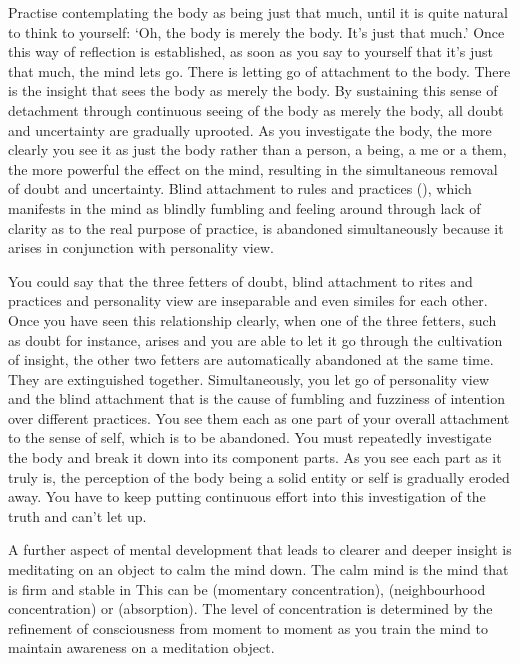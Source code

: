 Practise contemplating the body as being just that much, until it is quite natural to think to yourself: `Oh, the body is merely the body. It's just that much.' Once this way of reflection is established, as soon as you say to yourself that it's just that much, the mind lets go. There is letting go of attachment to the body. There is the insight that sees the body as merely the body. By sustaining this sense of detachment through continuous seeing of the body as merely the body, all doubt and uncertainty are gradually uprooted. As you investigate the body, the more clearly you see it as just the body rather than a person, a being, a me or a them, the more powerful the effect on the mind, resulting in the simultaneous removal of doubt and uncertainty. Blind attachment to rules and practices (), which manifests in the mind as blindly fumbling and feeling around through lack of clarity as to the real purpose of practice, is abandoned simultaneously because it arises in conjunction with personality view.

You could say that the three fetters of doubt, blind attachment to rites and practices and personality view are inseparable and even similes for each other. Once you have seen this relationship clearly, when one of the three fetters, such as doubt for instance, arises and you are able to let it go through the cultivation of insight, the other two fetters are automatically abandoned at the same time. They are extinguished together. Simultaneously, you let go of personality view and the blind attachment that is the cause of fumbling and fuzziness of intention over different practices. You see them each as one part of your overall attachment to the sense of self, which is to be abandoned. You must repeatedly investigate the body and break it down into its component parts. As you see each part as it truly is, the perception of the body being a solid entity or self is gradually eroded away. You have to keep putting continuous effort into this investigation of the truth and can't let up.

A further aspect of mental development that leads to clearer and deeper insight is meditating on an object to calm the mind down. The calm mind is the mind that is firm and stable in  This can be  (momentary concentration),  (neighbourhood concentration) or  (absorption). The level of concentration is determined by the refinement of consciousness from moment to moment as you train the mind to maintain awareness on a meditation object.

